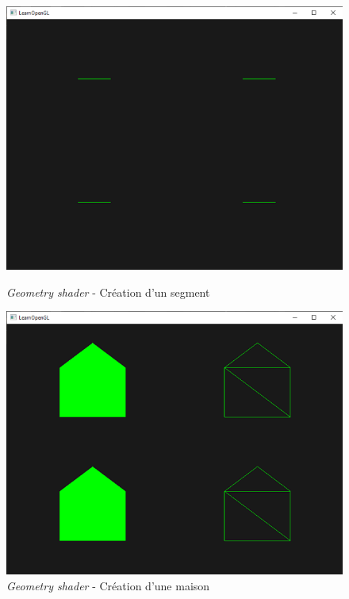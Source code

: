 \begin{figure}[h]
  \begin{minipage}[b]{0.45\linewidth}
    \centering
    \includegraphics[width=\linewidth]{images/shaders/geometry_shader_00.png}
    \caption{\textit{Geometry shader} - Création d'un segment}
    \label{geo00}
  \end{minipage}
  \hspace{0.1\linewidth} %
  \begin{minipage}[b]{0.45\linewidth}
    \centering
    \includegraphics[width=\linewidth]{geometry_shader_01.png}
    \caption{\textit{Geometry shader} - Création d'une maison}
    \label{geo01}
  \end{minipage}
\end{figure}


